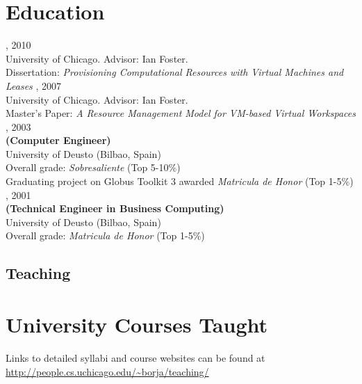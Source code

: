 \documentclass{resume}
\begin{document}
\section*{\hspace{-1cm}Education}
\begin{category}{}
, 2010\\
University of Chicago. Advisor: Ian Foster.\\
Dissertation: \emph{Provisioning Computational Resources with Virtual Machines and Leases} 
, 2007\\
University of Chicago. Advisor: Ian Foster.\\
Master's Paper: \emph{A Resource Management Model for VM-based Virtual Workspaces} 
, 2003\\
\textbf{(Computer Engineer)}\\
University of Deusto (Bilbao, Spain)\\
Overall grade: \emph{Sobresaliente} (Top 5-10\%)\\
Graduating project on Globus Toolkit 3 awarded \emph{Matricula de Honor} (Top 1-5\%)  
, 2001\\
\textbf{(Technical Engineer in Business Computing)}\\
University of Deusto (Bilbao, Spain)\\
Overall grade: \emph{Matricula de Honor} (Top 1-5\%)\\
\end{category}



\begin{center}
\section*{\huge Teaching}
\vspace{2ex}
\end{center}

\section*{\hspace{-1cm}University Courses Taught}

Links to detailed syllabi and course websites can be found at \url{http://people.cs.uchicago.edu/~borja/teaching/}
\end{document}
